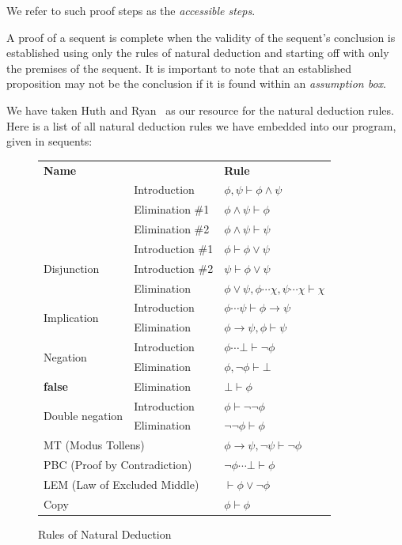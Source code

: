 \documentclass{article}
\newcommand{\imp}{\ensuremath{\rightarrow}}
\newcommand{\false}{\textbf{false}}
\begin{document}
We refer to such proof steps as the \textit{accessible steps}.

A proof of a sequent is complete when the validity of the sequent's conclusion
is established using only the rules of natural deduction and
starting off with only the premises of the sequent. It is important to
note that an established proposition may not be the conclusion if it is
found within an \textit{assumption box}.

We have taken Huth and Ryan~\cite{huth2004logic} as our resource for the
natural deduction rules. Here is a list of all natural deduction rules we
have embedded into our program, given in sequents:

\begin{figure}[H]
	\centering
	\renewcommand{\arraystretch}{1}
	\newcommand{\nl}{\\[3pt]}
	\newcommand{\nll}{\\[3pt]\hline}
	\begin{tabular}{l l|l}
		\multicolumn{2}{l|}{\textbf{Name}} & \textbf{Rule}\\\hhline{==|=}
		\multirow{3}{*}{Conjunction}
		& Introduction    & $\phi, \psi \vdash \phi \land \psi$\nl
		& Elimination \#1 & $\phi \land \psi \vdash \phi$\nl
		& Elimination \#2 & $\phi \land \psi \vdash \psi$\nll
		\multirow{3}{*}{Disjunction}
		& Introduction \#1 & $\phi \vdash \phi \lor \psi$\nl
		& Introduction \#2 & $\psi \vdash \phi \lor \psi$\nl
		& Elimination      & $\phi \lor \psi, \boxed{\phi \dotsb \chi},
			\boxed{\psi \dotsb \chi} \vdash \chi$\nll
		\multirow{2}{*}{Implication}
		& Introduction & $\boxed{\phi \dotsb \psi} \vdash \phi \imp \psi$\nl
		& Elimination  & $\phi \imp \psi, \phi \vdash \psi$\nll
		\multirow{2}{*}{Negation}
		& Introduction & $\boxed{\phi \dotsb \bot} \vdash \neg\phi$\nl
		& Elimination  & $\phi, \neg\phi \vdash \bot$\nll
		\multirow{1}{*}{\false{}}
		& Elimination  & $\bot \vdash \phi$\nll
		\multirow{2}{*}{Double negation}
		& Introduction & $\phi \vdash \neg\neg\phi$\nl
		& Elimination  & $\neg\neg\phi \vdash \phi$\nll
		\multicolumn{2}{l|}{MT (Modus Tollens)}
		& $\phi \imp \psi, \neg\psi \vdash \neg\phi$\nll
		\multicolumn{2}{l|}{PBC (Proof by Contradiction)}
		& $\boxed{\neg\phi \dotsb \bot} \vdash \phi$\nll
		\multicolumn{2}{l|}{LEM (Law of Excluded Middle)}
		& $\vdash \phi \lor \neg\phi$\nll
		\multicolumn{2}{l|}{Copy}
		& $\phi \vdash \phi$
	\end{tabular}
	\caption{Rules of Natural Deduction}
	\label{fig:nd}
\end{figure}
\end{document}
